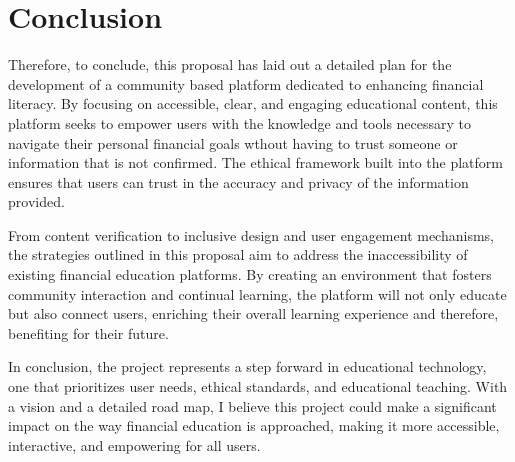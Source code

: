 \documentclass[12pt,twocolumn]{article}
\begin{document}
\section{Conclusion}

Therefore, to conclude, this proposal has laid out a detailed plan for the development of a community based platform dedicated to enhancing financial literacy. By focusing on accessible, clear, and engaging educational content, this platform seeks to empower users with the knowledge and tools necessary to navigate their personal financial goals wthout having to trust someone or information that is not confirmed. The ethical framework built into the platform ensures that users can trust in the accuracy and privacy of the information provided.

From  content verification to inclusive design and user engagement mechanisms, the strategies outlined in this proposal aim to address the inaccessibility of existing financial education platforms. By creating an environment that fosters community interaction and continual learning, the platform will not only educate but also connect users, enriching their overall learning experience and therefore, benefiting for their future.


In conclusion, the project represents a step forward in educational technology, one that prioritizes user needs, ethical standards, and educational teaching. With a vision and a detailed road map, I believe this project could  make a significant impact on the way financial education is approached, making it more accessible, interactive, and empowering for all users. 
\end{document}
